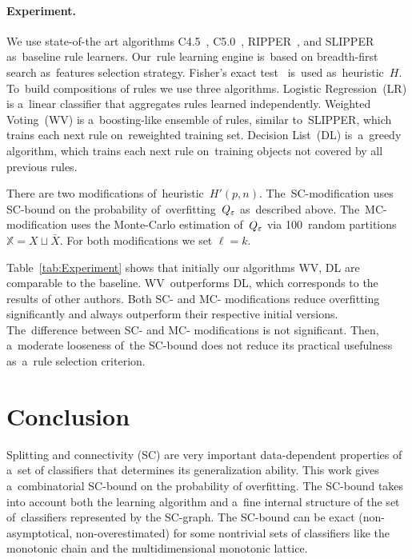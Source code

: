\documentclass{article}
\let\cite\citep
\def\XX{\mathbb{X}}
\newcommand{\X}{\bar X}
\begin{document}
\paragraph{Experiment.}
We use state-of-the art algorithms
C4.5~\cite{quinlan96bagging},
C5.0~\cite{quinlan93programs},
\mbox{RIPPER}~\cite{cohen95fast}, and
\mbox{SLIPPER}~\cite{cohen99simple}
as~baseline rule learners.
Our~rule learning engine is~based on breadth-first search as~features selection strategy.
Fisher's exact test~\cite{martin97exact} is~used as~heuristic~$H$.
To~build compositions of rules we use three algorithms.
Logistic Regression~(LR) is a~linear classifier that aggregates rules learned independently.
Weighted Voting~(WV) is a~boosting-like ensemble of rules, similar to~\mbox{SLIPPER},
which trains each next rule on~reweighted training set.
Decision List~(DL) is~a~greedy algorithm,
which trains each next rule on~training objects not covered by all previous rules.

There are two modifications of~heuristic~$H'(p,n)$.
The~SC-modification uses SC-bound on the probability of~overfitting~$Q_\varepsilon$ as~described above.
The~MC-modification uses the Monte-Carlo estimation of~$Q_\varepsilon$
via 100~random partitions $\XX = X\sqcup\X$.
For both modifications we set $\ell=k$.

Table~\ref{tab:Experiment} shows that
initially our algorithms WV, DL are comparable to the baseline.
WV~outperforms DL, which corresponds to the results of other authors.
Both SC- and MC- modifications reduce overfitting significantly
and always outperform their respective initial versions.
The~difference between SC- and MC- modifications is not significant.
Then, a~moderate looseness of~the SC-bound does not reduce %
its practical usefulness as~a~rule selection criterion.

\section{Conclusion}

Splitting and connectivity (SC) are very important data-dependent properties
of a~set of classifiers that determines its generalization ability.
This work gives a~combinatorial SC-bound on the probability of overfitting.
The SC-bound takes into account both the learning algorithm
and a~fine internal structure of the set of~classifiers
represented by the SC-graph.
The SC-bound can be exact (non-asymptotical, non-overestimated)
for some nontrivial sets of classifiers like
the monotonic chain and
the multidimensional monotonic lattice.
\end{document}
